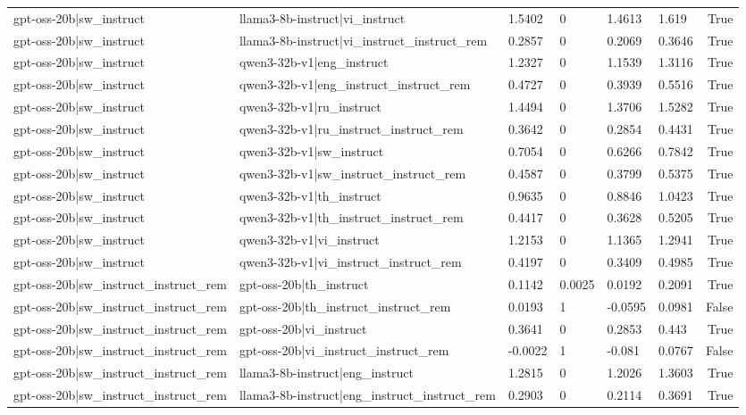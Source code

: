 \begin{table}
\begin{tabular}{llllllr}
gpt-oss-20b|sw_instruct & llama3-8b-instruct|vi_instruct & 1.5402 & 0 & 1.4613 & 1.619 & True \\
gpt-oss-20b|sw_instruct & llama3-8b-instruct|vi_instruct_instruct_rem & 0.2857 & 0 & 0.2069 & 0.3646 & True \\
gpt-oss-20b|sw_instruct & qwen3-32b-v1|eng_instruct & 1.2327 & 0 & 1.1539 & 1.3116 & True \\
gpt-oss-20b|sw_instruct & qwen3-32b-v1|eng_instruct_instruct_rem & 0.4727 & 0 & 0.3939 & 0.5516 & True \\
gpt-oss-20b|sw_instruct & qwen3-32b-v1|ru_instruct & 1.4494 & 0 & 1.3706 & 1.5282 & True \\
gpt-oss-20b|sw_instruct & qwen3-32b-v1|ru_instruct_instruct_rem & 0.3642 & 0 & 0.2854 & 0.4431 & True \\
gpt-oss-20b|sw_instruct & qwen3-32b-v1|sw_instruct & 0.7054 & 0 & 0.6266 & 0.7842 & True \\
gpt-oss-20b|sw_instruct & qwen3-32b-v1|sw_instruct_instruct_rem & 0.4587 & 0 & 0.3799 & 0.5375 & True \\
gpt-oss-20b|sw_instruct & qwen3-32b-v1|th_instruct & 0.9635 & 0 & 0.8846 & 1.0423 & True \\
gpt-oss-20b|sw_instruct & qwen3-32b-v1|th_instruct_instruct_rem & 0.4417 & 0 & 0.3628 & 0.5205 & True \\
gpt-oss-20b|sw_instruct & qwen3-32b-v1|vi_instruct & 1.2153 & 0 & 1.1365 & 1.2941 & True \\
gpt-oss-20b|sw_instruct & qwen3-32b-v1|vi_instruct_instruct_rem & 0.4197 & 0 & 0.3409 & 0.4985 & True \\
gpt-oss-20b|sw_instruct_instruct_rem & gpt-oss-20b|th_instruct & 0.1142 & 0.0025 & 0.0192 & 0.2091 & True \\
gpt-oss-20b|sw_instruct_instruct_rem & gpt-oss-20b|th_instruct_instruct_rem & 0.0193 & 1 & -0.0595 & 0.0981 & False \\
gpt-oss-20b|sw_instruct_instruct_rem & gpt-oss-20b|vi_instruct & 0.3641 & 0 & 0.2853 & 0.443 & True \\
gpt-oss-20b|sw_instruct_instruct_rem & gpt-oss-20b|vi_instruct_instruct_rem & -0.0022 & 1 & -0.081 & 0.0767 & False \\
gpt-oss-20b|sw_instruct_instruct_rem & llama3-8b-instruct|eng_instruct & 1.2815 & 0 & 1.2026 & 1.3603 & True \\
gpt-oss-20b|sw_instruct_instruct_rem & llama3-8b-instruct|eng_instruct_instruct_rem & 0.2903 & 0 & 0.2114 & 0.3691 & True \\

\end{tabular}
\end{table}
